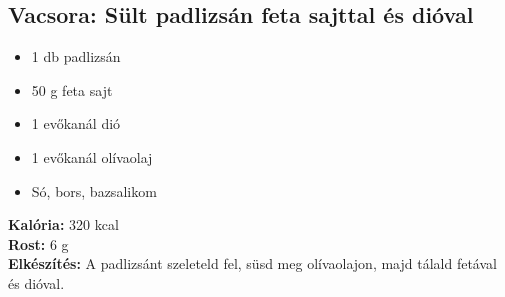 \sordisz
\subsection{Vacsora: Sült padlizsán feta sajttal és dióval}
\begin{itemize}
    \item 1 db padlizsán
    \item 50 g feta sajt
    \item 1 evőkanál dió
    \item 1 evőkanál olívaolaj
    \item Só, bors, bazsalikom
\end{itemize}
\textbf{Kalória:} 320 kcal \\
\textbf{Rost:} 6 g \\
\textbf{Elkészítés:} A padlizsánt szeleteld fel, süsd meg olívaolajon, majd tálald fetával és dióval.

\newpage

